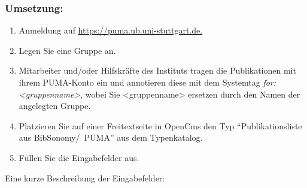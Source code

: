 \subsubsection*{Umsetzung:}\label{sss:iplPuma}
\begin{enumerate}
\item  Anmeldung auf \url{https://puma.ub.uni-stuttgart.de.}
\item Legen Sie eine Gruppe an.
\item Mitarbeiter und/oder Hilfskräfte des Instituts tragen die
  Publikationen mit ihrem PUMA-Konto ein und annotieren diese mit dem
  Systemtag \textit{for:<gruppenname>}, wobei Sie <gruppenname>
  ersetzen durch den Namen der angelegten Gruppe.
\item Platzieren Sie auf einer Freitextseite in OpenCms den Typ \enquote{Publikationsliste aus BibSonomy/~PUMA} aus dem Typenkatalog.
\item Füllen Sie die Eingabefelder aus.
\end{enumerate}
Eine kurze Beschreibung der Eingabefelder:\newline
